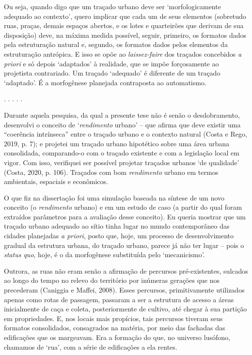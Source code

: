 \documentclass[12pt, a4paper]{book} %
\begin{document}
        Ou seja, quando digo que um traçado urbano deve ser `morfologicamente adequado ao contexto', quero implicar que cada um de seus elementos (sobretudo ruas, praças, demais espaços abertos, e os lotes e quarteirões que derivam de sua disposição) deve, na máxima medida possível, seguir, primeiro, os formatos dados pela estruturação natural e, segundo, os formatos dados pelos elementos da estruturação antrópica. E isso se opõe ao \textit{laissez-faire} dos traçados concebidos \textit{a priori} e só depois `adaptados' à realidade, que se impõe forçosamente ao projetista contrariado. Um traçado `adequado' é diferente de um traçado `adaptado'. É a morfogênese planejada contraposta ao automatismo.


        \begin{center}
        . . . . .
        \end{center}

        Durante aquela pesquisa, da qual a presente tese não é senão o desdobramento, desenvolvi o conceito de `\textit{rendimento} urbano' – que afirma que deve existir uma ``coerência intrínseca'' entre o traçado urbano e o contexto natural (Costa e Rego, 2019, p. 7); e projetei um traçado urbano hipotético sobre uma área urbana consolidada, comparando-o com o traçado existente e com a legislação local em vigor. Com isso, verifiquei ser possível projetar traçados urbanos `de qualidade' (Costa, 2020, p. 106). Traçados com bom \textit{rendimento} urbano em termos ambientais, espaciais e econômicos.

        O que fiz na dissertação foi uma simulação baseada na síntese de um novo conceito (o \textit{rendimento} urbano) e em um estudo de caso (a partir do qual foram extraídos parâmetros para a avaliação desse conceito). Eu queria mostrar que um traçado urbano adequado ao sítio tinha lugar no mundo contemporâneo das cidades planejadas \textit{a priori}, posto que, hoje, um processo de desenvolvimento gradual da estrutura urbana, do traçado urbano, parece já não ter lugar – pois o \textit{status quo}, hoje, é o da morfogênese substituída pelo `mecanicismo'. 

        Outrora, as ruas não eram senão a afirmação de percursos pré-existentes, sulcados ao longo do tempo no relevo do território por inúmeras gerações que nos precederam (Caniggia e Maffei, 2008).   Esses percursos, primitivamente utilizados apenas como rotas de passagem, passaram a ser a estrutura de acesso a áreas inicialmente de caça e coleta, posteriormente de cultivo, até chegar à sua partição em propriedades. E, nos locais mais propícios, tais percursos tiveram seus formatos consolidados, consagrados na matéria, por meio das fachadas das edificações que os margeavam. Era a formação do que, no universo lusófono, chamamos de `rua', com a série de edificações a ela rentes.
\end{document}
